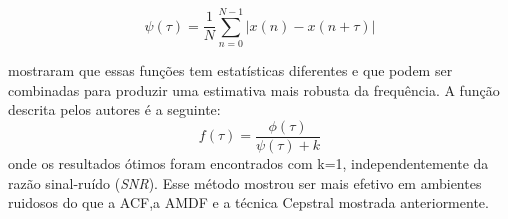 $$\psi(\tau) = \frac{1}{N}\sum_{n=0}^{N-1}  \left | x(n)-x(n+\tau) \right |$$


\cite{kobayashi2000weighted} mostraram que essas funções tem estatísticas diferentes e que podem ser combinadas para produzir uma estimativa mais robusta da frequência. A função descrita pelos autores é a seguinte:
$$f(\tau) = \frac{\phi(\tau)}{\psi(\tau)+k}$$
onde os resultados ótimos foram encontrados com k=1, independentemente da razão sinal-ruído (\emph{SNR}). Esse método mostrou ser mais efetivo em ambientes ruidosos do que a ACF,a AMDF e a técnica Cepstral mostrada anteriormente.

